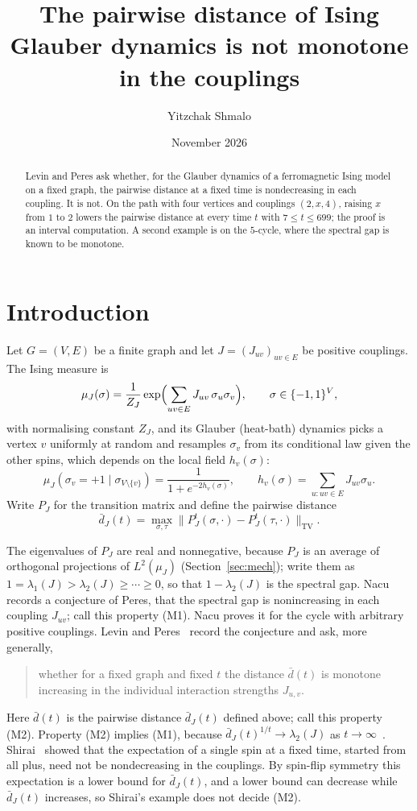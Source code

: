 \documentclass[11pt]{amsart}
\title[Pairwise distance of Ising Glauber dynamics]{The pairwise distance of Ising Glauber dynamics is not monotone in the couplings}
\author{Yitzchak Shmalo}
\date{November 2026}
\theoremstyle{remark}
\newcommand{\dbar}{\bar d}
\newcommand{\TV}{\mathrm{TV}}
\begin{document}
\begin{abstract}
Levin and Peres ask whether, for the Glauber dynamics of a ferromagnetic Ising model on a fixed graph, the pairwise distance at a fixed time is nondecreasing in each coupling. It is not. On the path with four vertices and couplings $(2,x,4)$, raising $x$ from $1$ to $2$ lowers the pairwise distance at every time $t$ with $7\le t\le 699$; the proof is an interval computation. A second example is on the $5$-cycle, where the spectral gap is known to be monotone.
\end{abstract}
\maketitle

\section{Introduction}\label{sec:intro}

Let $G=(V,E)$ be a finite graph and let $J=(J_{uv})_{uv\in E}$ be positive couplings. The Ising measure is
\[
\mu_J(\sigma)=\frac1{Z_J}\exp\Bigl(\sum_{uv\in E}J_{uv}\,\sigma_u\sigma_v\Bigr),\qquad \sigma\in\{-1,1\}^V,
\]
with normalising constant $Z_J$, and its Glauber (heat-bath) dynamics picks a vertex $v$ uniformly at random and resamples $\sigma_v$ from its conditional law given the other spins, which depends on the local field $h_v(\sigma)$:
\begin{equation}\label{eq:cond}
\mu_J(\sigma_v=+1\mid\sigma_{V\setminus\{v\}})=\frac{1}{1+e^{-2h_v(\sigma)}},\qquad h_v(\sigma)=\sum_{u\colon uv\in E}J_{uv}\sigma_u .
\end{equation}
Write $P_J$ for the transition matrix and define the pairwise distance
\[
\dbar_J(t)=\max_{\sigma,\tau}\bigl\|P_J^t(\sigma,\cdot)-P_J^t(\tau,\cdot)\bigr\|_{\TV}.
\]

The eigenvalues of $P_J$ are real and nonnegative, because $P_J$ is an average of orthogonal projections of $L^2(\mu_J)$ (Section~\ref{sec:mech}); write them as $1=\lambda_1(J)>\lambda_2(J)\ge\cdots\ge0$, so that $1-\lambda_2(J)$ is the spectral gap. Nacu~\cite{Nacu} records a conjecture of Peres, that the spectral gap is nonincreasing in each coupling $J_{uv}$; call this property (M1). Nacu proves it for the cycle with arbitrary positive couplings. Levin and Peres~\cite[Section~26.1, Question~2]{LP} record the conjecture and ask, more generally,
\begin{quote}
whether for a fixed graph and fixed $t$ the distance $\bar d(t)$ is monotone increasing in the individual interaction strengths $J_{u,v}$.
\end{quote}
Here $\bar d(t)$ is the pairwise distance $\dbar_J(t)$ defined above; call this property (M2). Property (M2) implies (M1), because $\dbar_J(t)^{1/t}\to\lambda_2(J)$ as $t\to\infty$~\cite[Corollary~12.7 and Lemma~4.10]{LP}. Shirai~\cite{Shirai} showed that the expectation of a single spin at a fixed time, started from all plus, need not be nondecreasing in the couplings. By spin-flip symmetry this expectation is a lower bound for $\dbar_J(t)$, and a lower bound can decrease while $\dbar_J(t)$ increases, so Shirai's example does not decide (M2).
\end{document}
